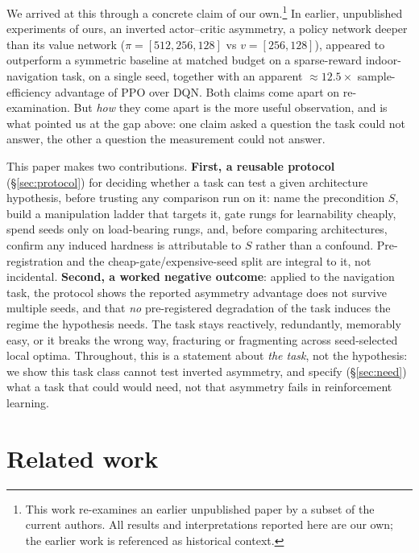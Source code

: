 \documentclass[10pt]{article}
\begin{document}
We arrived at this through a concrete claim of our own.\ifdefined\ispreprint\footnote{This work re-examines an earlier
unpublished paper by a subset of the current authors. All results and interpretations
reported here are our own; the earlier work is referenced as historical context.}\fi{}
In earlier, unpublished experiments
of ours, an inverted actor--critic asymmetry, a policy network deeper than its value
network ($\pi=[512,256,128]$ vs $v=[256,128]$), appeared to outperform a symmetric baseline
at matched budget on a sparse-reward indoor-navigation task, on a single seed, together
with an apparent ${\approx}12.5\times$ sample-efficiency advantage of PPO over DQN. Both
claims come apart on re-examination. But \emph{how} they come apart is the more useful
observation, and is what pointed us at the gap above: one claim asked a question the task
could not answer, the other a question the measurement could not answer.

This paper makes two contributions. \textbf{First, a reusable protocol}
(\S\ref{sec:protocol}) for deciding whether a task can test a given architecture
hypothesis, before trusting any comparison run on it: name the precondition $S$, build a
manipulation ladder that targets it, gate rungs for learnability cheaply, spend seeds only
on load-bearing rungs, and, before comparing architectures, confirm any induced hardness is
attributable to $S$ rather than a confound. Pre-registration and the
cheap-gate/expensive-seed split are integral to it, not incidental. \textbf{Second, a
worked negative outcome}: applied to the navigation task, the protocol shows the reported
asymmetry advantage does not survive multiple seeds, and that \emph{no} pre-registered
degradation of the task induces the regime the hypothesis needs. The task stays reactively,
redundantly, memorably easy, or it breaks the wrong way, fracturing or fragmenting across
seed-selected local optima. Throughout, this is a statement about \emph{the task}, not the
hypothesis: we show this task class cannot test inverted asymmetry, and specify
(\S\ref{sec:need}) what a task that could would need, not that asymmetry fails in
reinforcement learning.

\section{Related work}
\label{sec:related}
\end{document}
